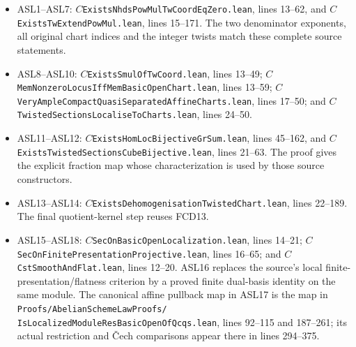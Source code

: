 \begin{itemize}
\item ASL1--ASL7:
$C$\texttt{Exists\allowbreak{}Nhds\allowbreak{}Pow\allowbreak{}Mul\allowbreak{}Tw\allowbreak{}Coord\allowbreak{}Eq\allowbreak{}Zero.lean},
lines 13--62, and
$C$\texttt{Exists\allowbreak{}Tw\allowbreak{}Extend\allowbreak{}Pow\allowbreak{}Mul.lean}, lines 15--171.
The two denominator exponents, all original chart indices
and the integer twists match these complete source statements.
\item ASL8--ASL10:
$C$\texttt{Exists\allowbreak{}Smul\allowbreak{}Of\allowbreak{}Tw\allowbreak{}Coord.lean}, lines 13--49;
$C$\texttt{Mem\allowbreak{}Nonzero\allowbreak{}Locus\allowbreak{}Iff\allowbreak{}Mem\allowbreak{}Basic\allowbreak{}Open\allowbreak{}Chart.lean},
lines 13--59;
$C$\texttt{Very\allowbreak{}Ample\allowbreak{}Compact\allowbreak{}Quasi\allowbreak{}Separated\allowbreak{}Affine\allowbreak{}Charts.lean},
lines 17--50; and
$C$\texttt{Twisted\allowbreak{}Sections\allowbreak{}Localise\allowbreak{}To\allowbreak{}Charts.lean}, lines 24--50.
\item ASL11--ASL12:
$C$\texttt{Exists\allowbreak{}Hom\allowbreak{}Loc\allowbreak{}Bijective\allowbreak{}Gr\allowbreak{}Sum.lean}, lines 45--162,
and $C$\texttt{Exists\allowbreak{}Twisted\allowbreak{}Sections\allowbreak{}Cube\allowbreak{}Bijective.lean},
lines 21--63.  The proof gives the explicit fraction map
whose characterization is used by those source constructors.
\item ASL13--ASL14:
$C$\texttt{Exists\allowbreak{}Dehomogenisation\allowbreak{}Twisted\allowbreak{}Chart.lean},
lines 22--189.  The final quotient-kernel step reuses FCD13.
\item ASL15--ASL18:
$C$\texttt{Sec\allowbreak{}On\allowbreak{}Basic\allowbreak{}Open\allowbreak{}Localization.lean}, lines 14--21;
$C$\texttt{Sec\allowbreak{}On\allowbreak{}Finite\allowbreak{}Presentation\allowbreak{}Projective.lean},
lines 16--65; and $C$\texttt{Cst\allowbreak{}Smooth\allowbreak{}And\allowbreak{}Flat.lean},
lines 12--20.  ASL16 replaces the source's local
finite-presentation/flatness criterion by a proved finite
dual-basis identity on the same module.
The canonical affine pullback map in ASL17 is the map in
\texttt{Proofs/\allowbreak{}Abelian\allowbreak{}Scheme\allowbreak{}Law\allowbreak{}Proofs/\allowbreak{}}
\texttt{Is\allowbreak{}Localized\allowbreak{}Module\allowbreak{}Res\allowbreak{}Basic\allowbreak{}Open\allowbreak{}Of\allowbreak{}Qcqs.lean},
lines 92--115 and 187--261; its actual restriction and
\v Cech comparisons appear there in lines 294--375.

\end{itemize}
